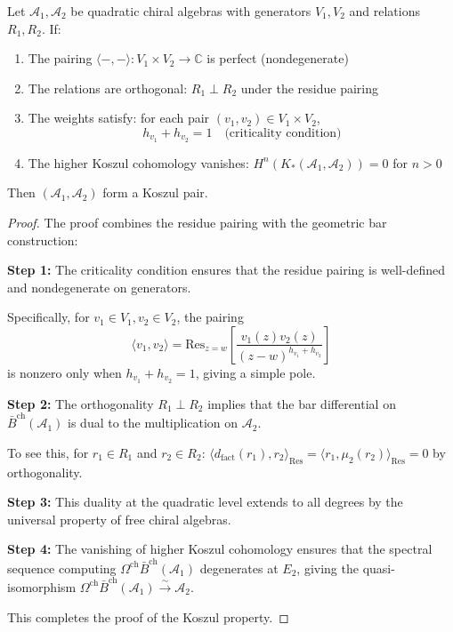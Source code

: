 \begin{theorem}\label{thm:quadratic-criterion}
Let $\mathcal{A}_1, \mathcal{A}_2$ be quadratic chiral algebras with generators $V_1, V_2$ and relations 
$R_1, R_2$. If:
\begin{enumerate}
\item The pairing $\langle -, - \rangle: V_1 \times V_2 \to \mathbb{C}$ is perfect (nondegenerate)
\item The relations are orthogonal: $R_1 \perp R_2$ under the residue pairing
\item The weights satisfy: for each pair $(v_1, v_2) \in V_1 \times V_2$,
\[
h_{v_1} + h_{v_2} = 1 \quad \text{(criticality condition)}
\]
\item The higher Koszul cohomology vanishes: $H^n(K_*(\mathcal{A}_1, \mathcal{A}_2)) = 0$ for $n > 0$
\end{enumerate}
Then $(\mathcal{A}_1, \mathcal{A}_2)$ form a Koszul pair.
\end{theorem}
 
\begin{proof}
The proof combines the residue pairing with the geometric bar construction:

\textbf{Step 1:} The criticality condition ensures that the residue pairing is well-defined and nondegenerate on generators.

Specifically, for $v_1 \in V_1, v_2 \in V_2$, the pairing
$$\langle v_1, v_2 \rangle = \text{Res}_{z=w}\left[\frac{v_1(z)v_2(z)}{(z-w)^{h_{v_1} + h_{v_2}}}\right]$$
is nonzero only when $h_{v_1} + h_{v_2} = 1$, giving a simple pole.

\textbf{Step 2:} The orthogonality $R_1 \perp R_2$ implies that the bar differential on $\bar{B}^{\text{ch}}(\mathcal{A}_1)$ is dual to the multiplication on $\mathcal{A}_2$.

To see this, for $r_1 \in R_1$ and $r_2 \in R_2$:
$\langle d_{\text{fact}}(r_1), r_2 \rangle_{\text{Res}} = \langle r_1, \mu_2(r_2) \rangle_{\text{Res}} = 0$
by orthogonality.

\textbf{Step 3:} This duality at the quadratic level extends to all degrees by the universal property of free chiral algebras.

\textbf{Step 4:} The vanishing of higher Koszul cohomology ensures that the spectral sequence computing $\Omega^{\text{ch}}\bar{B}^{\text{ch}}(\mathcal{A}_1)$ degenerates at $E_2$, giving the quasi-isomorphism $\Omega^{\text{ch}}\bar{B}^{\text{ch}}(\mathcal{A}_1) \xrightarrow{\sim} \mathcal{A}_2$.

This completes the proof of the Koszul property.
\end{proof}

